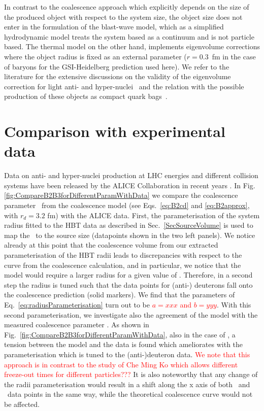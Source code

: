 \documentclass[a4paper,11pt]{scrartcl} %
\begin{document}
In contrast to the coalescence approach which explicitly depends on the size of the produced object with respect to the system size, the object size does not enter in the formulation of the blast-wave model, which as a simplified hydrodynamic model treats the system based as a continuum and is not particle based. The thermal model on the other hand, implements eigenvolume corrections where the object radius is fixed as an external parameter ($r=0.3$~fm in the case of baryons for the GSI-Heidelberg prediction used here). We refer to the literature for the extensive discussions on the validity of the eigenvolume correction for light anti- and hyper-nuclei~\cite{Vovchenko:2016mwg} and the relation with the possible production of these objects as compact quark bags~\cite{Andronic:2017}.



\section{Comparison with experimental data}\label{sec:comparison}

Data on anti- and hyper-nuclei production at LHC energies and different collision systems have been released by the ALICE Collaboration in recent years \cite{ALICE:deuteronppPbPb2015,ALICE:nucleipp2017,ALICE:deuteronflow2017,Adam:2015yta}. 
In Fig. \ref{fig:CompareB2B3forDifferentParamWithData} we compare the coalescence parameter \btwo~from the coalescence model (see Eqs.~\ref{eq:B2cd} and \ref{eq:B2approx}, with $r_{d} = 3.2$ fm) with the ALICE data.  
First, the parameterisation of the system radius fitted to the HBT data as described in Sec.~\ref{SecSourceVolume} is used to map the \avdNdeta~to the source size (datapoints shown in the two left panels).
We notice already at this point that the coalescence volume from our extracted parameterisation of the HBT radii leads to discrepancies with respect to the curve from the coalescence calculation, and in particular, we notice that the model would require a larger radius for a given value of \btwo.
Therefore, in a second step the radius is tuned such that the data points for (anti-) deuterons fall onto the coalescence prediction (solid markers). We find that the parameters of Eq.~\ref{eq:radiusParameterisation} turn out to be \textcolor{red}{$a = xxx$ and $b = yyy$}. 
With this second parameterisation, we investigate also the agreement of the model with the measured coalescence parameter \bthree. As shown in Fig.~\ref{fig:CompareB2B3forDifferentParamWithData}, also in the case of \bthree, a tension between the model and the data is found which ameliorates with the parameterisation which is tuned to the (anti-)deuteron data.  \textcolor{red}{We note that this approach is in contrast to the study of Che Ming Ko which allows different freeze-out times for different particles???}
It is also noteworthy that any change of the radii parameterisation would result in a shift along the x axis of both \btwo~and \bthree~data points in the same way, while the theoretical coalescence curve would not be affected. 
 
\end{document}

